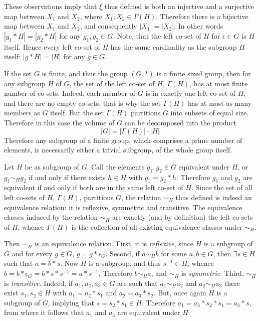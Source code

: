 \documentclass[a4paper]{article}
\newcommand{\brac}[1]{{\left({#1}\right)}}
\begin{document}
These observations imply that $\xi$ thus defined is both an injective and a surjective map between $X_1$ and $X_2$, where $X_1, X_2\in \Gamma(H)$. Therefore there is a bijective map between $X_1$ and $X_2$, and consequently $|X_1|=|X_2|$. In other words $|g_1\ast H| = |g_2\ast H|$ for any $g_1, g_2\in G$. Note, that the left co-set of $H$ for $\epsilon\in G$ is $H$ itself. Hence every left co-set of $H$ has the same cardinality as the subgroup $H$ itself: $|g\ast H| = |H|$ for any $g\in G$.

If the set $G$ is finite, and thus the group $\brac{G, \ast}$ is a finite sized group, then for any subgroup $H$ of $G$, the set of the left co-set of $H$, $\Gamma(H)$, has at most finite number of co-sets. Indeed, each member of $G$ is in exactly one left co-set of $H$, and there are no empty co-sets, that is why the set $\Gamma(H)$ has at most as many members as $G$ itself. But the set $\Gamma(H)$ partitions $G$ into subsets of equal size. Therefore in this case the volume of $G$ can be decomposed into the product \[|G| = |\Gamma(H)|\cdot|H|\] Therefore any subgroup of a finite group, which comprises a prime number of elements, is necessarily either a trivial subgroup, of the whole group itself.

Let $H$ be as subgroup of $G$. Call the elements $g_1, g_2\in G$ equivalent under $H$, or $g_1\sim_H g_2$ if and only if there exists $h\in H$ with $g_1=g_2\ast h$. Therefore $g_1$ and $g_2$ are equivalent if and only if both are in the same left co-set of $H$. Since the set of all left co-sets of $H$, $\Gamma(H)$, partitions $G$, the relation $\sim_H$ thus defined is indeed an equivalence relation: it is reflexive, symmetric and transitive. The equivalence classes induced by the relation $\sim_H$ are exactly (and by definition) the left co-sets of $H$, whence $\Gamma(H)$ is the collection of all existing equivalence classes under $\sim_H$.

Then $\sim_H$ is an equivalence relation. First, it is \emph{reflexive}, since $H$ is a subgroup of $G$ and for every $g\in G$, $g=g\ast \epsilon_G$. Second, if $a\sim_H b$ for some $a,b\in G$, then $\exists{s\in H}$ such that $a=b\ast s$. Now $H$ is a subgroup, and thus $s^{-1}\in H$, whence $b=b\ast \epsilon_G=b\ast s\ast s^{-1}=a\ast s^{-1}$. Therefore $b\sim_H a$, and $\sim_H$ is \emph{symmetric}. Third, $\sim_H$ is \emph{transitive}. Indeed, if $a_1,a_2,a_3\in G$ are such that $a_1\sim_H a_2$ and $a_2\sim_H a_3$ there exist $s_1, s_2\in H$ with $a_1=a_2\ast s_1$ and $a_2=a_3\ast s_2$. But, once again $H$ is a subgroup of $G$, implying that $s = s_2\ast s_1\in H$. Therefore $a_1=a_3\ast s_2\ast s_1=a_3\ast s$, from where it follows that $a_1$ and $a_3$ are equivalent under $H$.
\end{document}
